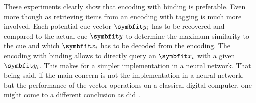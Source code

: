 These experiments clearly show that encoding with binding is preferable.
Even more though as retrieving items from an encoding with tagging is much more involved.
Each potential cue vector $\vc y_i$ has to be recovered and compared to the actual cue $\vc y$ to determine the maximum similarity to the cue and which $\vc x_i$ has to be decoded from the encoding.
The encoding with binding allows to directly query an $\vc x_i$ with a given $\vc y_i$.
This makes for a simpler implementation in a neural network.
That being said, if the main concern is not the implementation in a neural network, but the performance of the vector operations on a classical digital computer, one might come to a different conclusion as did \textcite{recchia2015}.
